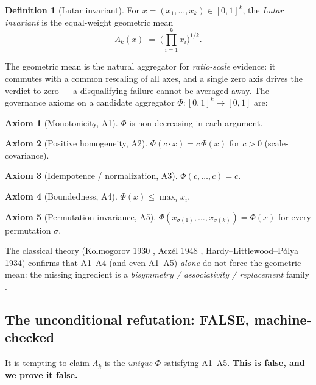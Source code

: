 \documentclass[11pt]{article}
\theoremstyle{plain}
\theoremstyle{definition}
\newtheorem{definition}[theorem]{Definition}
\newtheorem{axiom}{Axiom}
\theoremstyle{remark}
\newcommand{\La}{\Lambda}
\begin{document}
\begin{definition}[Lutar invariant]
For $x = (x_1,\dots,x_k)\in[0,1]^k$, the \emph{Lutar invariant} is the
equal-weight geometric mean
\[
  \La_k(x) \;=\; \Big(\textstyle\prod_{i=1}^{k} x_i\Big)^{1/k}.
\]
\end{definition}

The geometric mean is the natural aggregator for \emph{ratio-scale} evidence: it
commutes with a common rescaling of all axes, and a single zero axis drives the
verdict to zero --- a disqualifying failure cannot be averaged away. The
governance axioms on a candidate aggregator $\Phi:[0,1]^k\to[0,1]$ are:

\begin{axiom}[Monotonicity, A1]\label{ax:a1}
$\Phi$ is non-decreasing in each argument.
\end{axiom}
\begin{axiom}[Positive homogeneity, A2]\label{ax:a2}
$\Phi(c\cdot x) = c\,\Phi(x)$ for $c>0$ (scale-covariance).
\end{axiom}
\begin{axiom}[Idempotence / normalization, A3]\label{ax:a3}
$\Phi(c,\dots,c) = c$.
\end{axiom}
\begin{axiom}[Boundedness, A4]\label{ax:a4}
$\Phi(x)\le \max_i x_i$.
\end{axiom}
\begin{axiom}[Permutation invariance, A5]\label{ax:a5}
$\Phi(x_{\sigma(1)},\dots,x_{\sigma(k)}) = \Phi(x)$ for every permutation
$\sigma$.
\end{axiom}

The classical theory (Kolmogorov 1930 \cite{kolmogorov1930}, Acz\'el 1948
\cite{aczel1948}, Hardy--Littlewood--P\'olya 1934) confirms that A1--A4 (and even
A1--A5) \emph{alone} do not force the geometric mean: the missing ingredient is a
\emph{bisymmetry / associativity / replacement} family
\cite{quasiarith,aczel1966}.

\subsection{The unconditional refutation: FALSE, machine-checked}
\label{sec:false}
It is tempting to claim $\La_k$ is the \emph{unique} $\Phi$ satisfying A1--A5.
\textbf{This is false, and we prove it false.}
\end{document}
